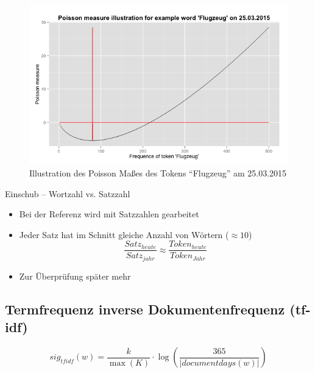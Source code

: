 \begin{figure}[h!]
    \centering
    \includegraphics[width=1\textwidth]{pictures/poissonMeasureFlugzeug.png}
    \caption{Illustration des Poisson Ma\ss es des Tokens \enquote{Flugzeug} am 25.03.2015}\label{pic.poisson_mass}
\end{figure}


  
\begin{frame}{Einschub – Wortzahl vs. Satzzahl}
	\begin{itemize}
		\item{Bei der Referenz wird mit Satzzahlen gearbeitet}
		
		\item{Jeder Satz hat im Schnitt gleiche Anzahl von W\"ortern ($\approx 10$)\\
			\begin{equation}
				\frac{Satz_{heute}}{Satz_{jahr}} \approx \frac{Token_{heute}}{Token_{Jahr}}
			\end{equation}
			}
		\item{Zur \"Uberpr\"ufung sp\"ater mehr}
	\end{itemize}
\end{frame}


 
\subsection{Termfrequenz inverse Dokumentenfrequenz (tf-idf)}
 \begin{equation}
sig_{tf idf}(w) = \frac{k}{\max(K)} \cdot \log ( \frac{365}{|documentdays(w)|})
\end{equation}

